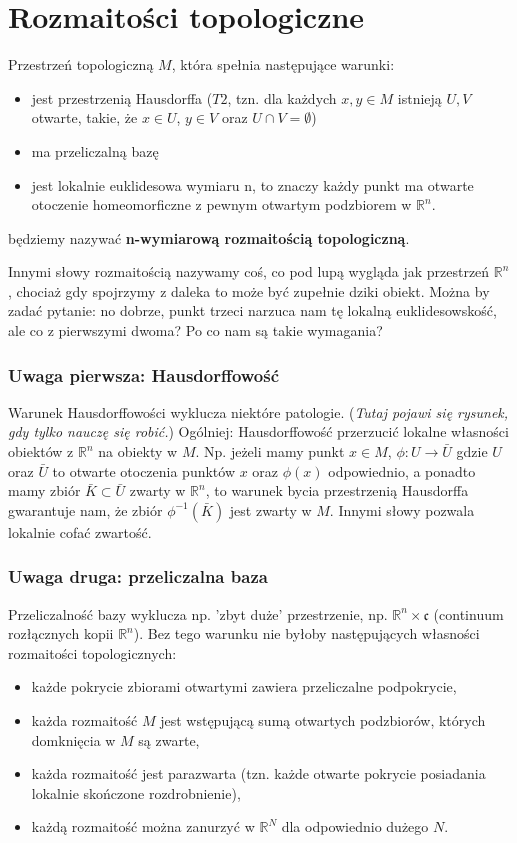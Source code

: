 \section{Rozmaitości topologiczne}
\begin{definition}
	Przestrzeń topologiczną $M$, która spełnia następujące warunki:
	\begin{itemize}
		\item jest przestrzenią Hausdorffa ($T2$, tzn. dla każdych $x,y \in M$ istnieją $U, V$ otwarte, takie, że $x \in U$, $y \in V$ oraz $U \cap V = \emptyset$)
		\item ma przeliczalną bazę
		\item jest lokalnie euklidesowa wymiaru n, to znaczy każdy punkt ma otwarte otoczenie homeomorficzne z pewnym otwartym podzbiorem w $\mathbb{R}^n$.
	\end{itemize}
	będziemy nazywać \textbf{n-wymiarową rozmaitością topologiczną}.
\end{definition}

Innymi słowy rozmaitością nazywamy coś, co pod lupą wygląda jak przestrzeń $\mathbb{R}^n$, chociaż gdy spojrzymy z daleka to może być zupełnie dziki obiekt. Można by zadać pytanie: no dobrze, punkt trzeci narzuca nam tę lokalną euklidesowskość, ale co z pierwszymi dwoma? Po co nam są takie wymagania?

\subsubsection{Uwaga pierwsza: Hausdorffowość}
Warunek Hausdorffowości wyklucza niektóre patologie. (\textit{Tutaj pojawi się rysunek, gdy tylko nauczę się robić.}) Ogólniej: Hausdorffowość przerzucić lokalne własności obiektów z $\mathbb{R}^n$ na obiekty w $M$. Np. jeżeli mamy punkt $x \in M$, $\phi : U \to \bar{U}$  gdzie $U$ oraz $\bar{U}$ to otwarte otoczenia punktów $x$ oraz $\phi(x)$ odpowiednio, a ponadto mamy zbiór $\bar{K} \subset \bar{U}$ zwarty w $\mathbb{R}^n$, to warunek bycia przestrzenią Hausdorffa gwarantuje nam, że zbiór $\phi^{-1}\left(\bar{K}\right)$ jest zwarty w $M$. Innymi słowy pozwala lokalnie cofać zwartość.

\subsubsection{Uwaga druga: przeliczalna baza}
Przeliczalność bazy wyklucza np. 'zbyt duże' przestrzenie, np. $\mathbb{R}^n \times \mathfrak{c}$ (continuum rozłącznych kopii $\mathbb{R}^n$). Bez tego warunku nie byłoby następujących własności rozmaitości topologicznych:
\begin{itemize}
	\item każde pokrycie zbiorami otwartymi zawiera przeliczalne podpokrycie,
	\item każda rozmaitość $M$ jest wstępującą sumą otwartych podzbiorów, których domknięcia w $M$ są zwarte,
	\item każda rozmaitość jest parazwarta (tzn. każde otwarte pokrycie posiadania lokalnie skończone rozdrobnienie),
	\item każdą rozmaitość można zanurzyć w $\mathbb{R}^N$ dla odpowiednio dużego $N$.
\end{itemize}

